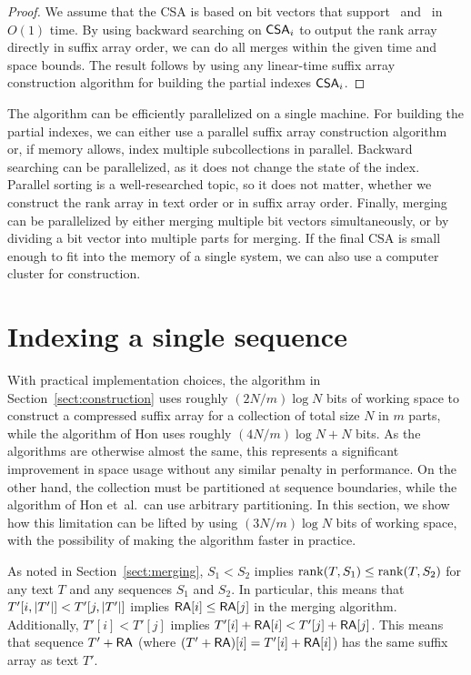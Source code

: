 \begin{proof}
We assume that the CSA is based on bit vectors that support \rank\ and \select\ in $O(1)$ time. By using backward searching on $\mathsf{CSA}_{i}$ to output the rank array directly in suffix array order, we can do all merges within the given time and space bounds. The result follows by using any linear-time suffix array construction algorithm for building the partial indexes $\mathsf{CSA}_{i}$.
\end{proof}

The algorithm can be efficiently parallelized on a single machine. For building the partial indexes, we can either use a parallel suffix array construction algorithm or, if memory allows, index multiple subcollections in parallel. Backward searching can be parallelized, as it does not change the state of the index. Parallel sorting is a well-researched topic, so it does not matter, whether we construct the rank array in text order or in suffix array order. Finally, merging can be parallelized by either merging multiple bit vectors simultaneously, or by dividing a bit vector into multiple parts for merging. If the final CSA is small enough to fit into the memory of a single system, we can also use a computer cluster for construction.


\section{Indexing a single sequence}\label{sect:single sequence}

With practical implementation choices, the algorithm in Section~\ref{sect:construction} uses roughly $(2N/m) \log N$ bits of working space to construct a compressed suffix array for a collection of total size $N$ in $m$ parts, while the algorithm of Hon  uses roughly $(4N/m) \log N + N$ bits. As the algorithms are otherwise almost the same, this represents a significant improvement in space usage without any similar penalty in performance. On the other hand, the collection must be partitioned at sequence boundaries, while the algorithm of Hon et~al.\ can use arbitrary partitioning. In this section, we show how this limitation can be lifted by using $(3N/m) \log N$ bits of working space, with the possibility of making the algorithm faster in practice.

As noted in Section~\ref{sect:merging}, $S_{1} < S_{2}$ implies $\operatorname{rank}(T, S_{1}) \le \operatorname{rank}(T, S_{2})$ for any text $T$ and any sequences $S_{1}$ and $S_{2}$. In particular, this means that $T'[i,\lvert T' \rvert] < T'[j,\lvert T' \rvert]$ implies $\mathsf{RA}[i] \le \mathsf{RA}[j]$ in the merging algorithm. Additionally, $T'[i] < T'[j]$ implies $T'[i] + \mathsf{RA}[i] < T'[j] + \mathsf{RA}[j]$. This means that sequence $T' + \mathsf{RA}$ (where $(T'+\mathsf{RA})[i] = T'[i] + \mathsf{RA}[i]$) has the same suffix array as text $T'$.

